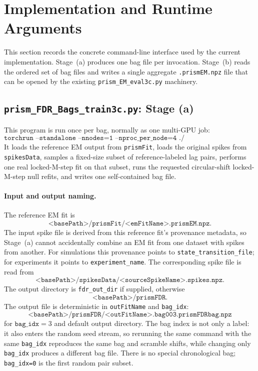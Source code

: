 \documentclass[11pt]{article}
\begin{document}
\section{Implementation and Runtime Arguments}
\label{sec:implementation}

This section records the concrete command-line interface used by the current
implementation. Stage~(a) produces one bag file per invocation. Stage~(b)
reads the ordered set of bag files and writes a single aggregate
\texttt{.prismEM.npz} file that can be opened by the existing
\texttt{prism\_EM\_eval3c.py} machinery.

\subsection{\texttt{prism\_FDR\_Bags\_train3c.py}: Stage (a)}

This program is run once per bag, normally as one multi-GPU job:
\[
\texttt{torchrun --standalone --nnodes=1 --nproc\_per\_node=4
./prism\_FDR\_Bags\_train3c.py ...}
\]
It loads the reference EM output from \texttt{prismFit}, loads the original
spikes from \texttt{spikesData}, samples a fixed-size subset of
reference-labeled lag pairs, performs one real locked-M-step fit on that
subset, runs the requested circular-shift locked-M-step null refits, and
writes one self-contained bag file.

\paragraph{Input and output naming.}
The reference EM fit is
\[
\texttt{<basePath>/prismFit/<emFitName>.prismEM.npz}.
\]
The input spike file is derived from this reference fit's provenance
metadata, so Stage~(a) cannot accidentally combine an EM fit from one
dataset with spikes from another. For simulations this provenance points to
\texttt{state\_transition\_file}; for experiments it points to
\texttt{experiment\_name}. The corresponding spike file is read from
\[
\texttt{<basePath>/spikesData/<sourceSpikeName>.spikes.npz}.
\]
The output directory is \texttt{fdr\_out\_dir} if supplied, otherwise
\[
\texttt{<basePath>/prismFDR}.
\]
The output file is deterministic in \texttt{outFitName} and \texttt{bag\_idx}:
\[
\texttt{<basePath>/prismFDR/<outFitName>.bag003.prismFDRbag.npz}
\]
for \(\texttt{bag\_idx}=3\) and default output directory. The bag index is
not only a label: it also enters the random seed stream, so rerunning the
same command with the same \texttt{bag\_idx} reproduces the same bag and
scramble shifts, while changing only \texttt{bag\_idx} produces a different
bag file. There is no special chronological bag; \texttt{bag\_idx=0} is the
first random pair subset.
\end{document}
